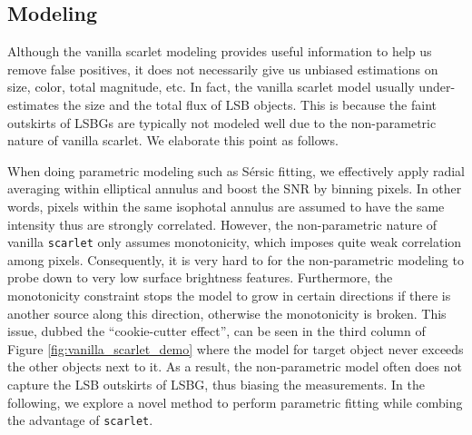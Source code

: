 \documentclass[twocolumn,astrosymb,twocolappendix]{aastex631}
\newcommand{\code}[1]{\texttt{#1}}
\newcommand{\sersic}{S\'ersic}
\begin{document}
\begin{CJK*}{UTF8}{gbsn}

\subsection{Modeling}\label{sec:modeling}
Although the vanilla scarlet modeling provides useful information to help us remove false positives, it does not necessarily give us unbiased estimations on size, color, total magnitude, etc. In fact, the vanilla scarlet model usually under-estimates the size and the total flux of LSB objects. This is because the faint outskirts of LSBGs are typically not modeled well due to the non-parametric nature of vanilla scarlet. We elaborate this point as follows.

When doing parametric modeling such as \sersic{} fitting, we effectively apply radial averaging within elliptical annulus and boost the SNR by binning pixels. In other words, pixels within the same isophotal annulus are assumed to have the same intensity thus are strongly correlated. However, the non-parametric nature of vanilla \code{scarlet} only assumes monotonicity, which imposes quite weak correlation among pixels. Consequently, it is very hard to for the non-parametric modeling to probe down to very low surface brightness features. Furthermore, the monotonicity constraint stops the model to grow in certain directions if there is another source along this direction, otherwise the monotonicity is broken. This issue, dubbed the ``cookie-cutter effect'', can be seen in the third column of Figure \ref{fig:vanilla_scarlet_demo} where the model for target object never exceeds the other objects next to it. As a result, the non-parametric model often does not capture the LSB outskirts of LSBG, thus biasing the measurements. In the following, we explore a novel method to perform parametric fitting while combing the advantage of \code{scarlet}.


\end{CJK*}
\end{document}

